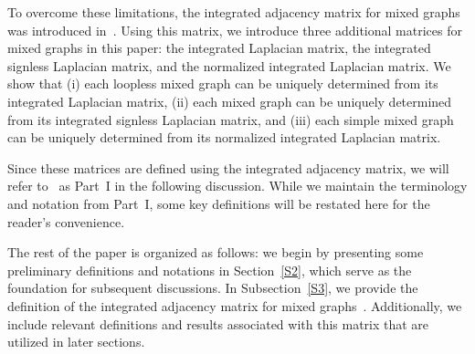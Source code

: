 \documentclass[12pt]{article}
\numberwithin{equation}{section}
\begin{document}
To overcome these limitations, the integrated adjacency matrix for mixed graphs was introduced in~\cite{Kalaimatrices1}. Using this matrix, we introduce three additional matrices for mixed graphs in this paper: the integrated Laplacian matrix, the integrated signless Laplacian matrix, and the normalized integrated Laplacian matrix. We show that (i) each loopless mixed graph can be uniquely determined from its integrated Laplacian matrix, (ii) each mixed graph can be uniquely determined from its integrated signless Laplacian matrix, and (iii) each simple mixed graph can be uniquely determined from its normalized integrated Laplacian matrix.

Since these matrices are defined using the integrated adjacency matrix, we will refer to~\cite{Kalaimatrices1} as Part~I in the following discussion. While we maintain the terminology and notation from Part~I, some key definitions will be restated here for the reader's convenience.


The rest of the paper is organized as follows:	we begin by presenting some preliminary definitions and notations in Section~\ref{S2}, which serve as the foundation for subsequent discussions. In Subsection~\ref{S3}, we provide the definition of the integrated adjacency matrix for mixed graphs~\cite{Kalaimatrices1}. Additionally, we include relevant definitions and results associated with this matrix that are utilized in later sections.
	

\end{document}

